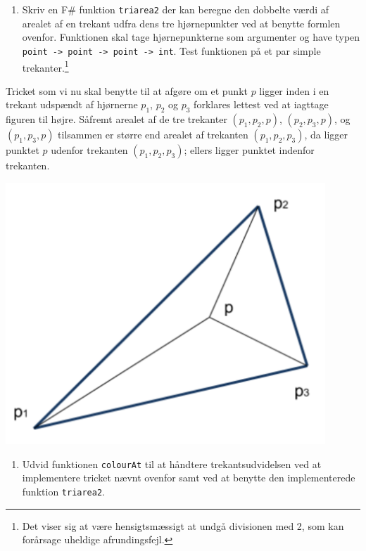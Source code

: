 \documentclass[a4paper,12pt]{article}
\begin{document}
\begin{enumerate}[label=8g.\arabic*,start=2]

\item Skriv en F\# funktion \lstinline{triarea2} der kan beregne den
  dobbelte værdi af arealet af en trekant udfra dens tre hjørnepunkter
  ved at benytte formlen ovenfor. Funktionen skal tage hjørnepunkterne
  som argumenter og have typen \lstinline{point -> point -> point -> int}. Test funktionen på et par simple trekanter.\footnote{Det
    viser sig at være hensigtsmæssigt at undgå divisionen med 2, som
    kan forårsage uheldige afrundingsfejl.}

\end{enumerate}

\begin{minipage}{.62\textwidth}

  Tricket som vi nu skal benytte til at afgøre om et punkt $p$ ligger
  inden i en trekant udspændt af hjørnerne $p_1$, $p_2$ og $p_3$
  forklares lettest ved at iagttage figuren til højre. Såfremt arealet
  af de tre trekanter $(p_1, p_2, p)$, $(p_2,p_3,p)$, og $(p_1,p_3,p)$
  tilsammen er større end arealet af trekanten $(p_1,p_2,p_3)$, da
  ligger punktet $p$ udenfor trekanten $(p_1,p_2,p_3)$; ellers ligger
  punktet indenfor trekanten.

\end{minipage} \hfill \begin{minipage}{.35\textwidth}
\includegraphics[width=0.9\textwidth]{triarea.png}
\end{minipage}

\begin{enumerate}[label=8g.\arabic*,start=3]

\item Udvid funktionen \texttt{colourAt} til at håndtere
  trekantsudvidelsen ved at implementere tricket nævnt ovenfor samt
  ved at benytte den implementerede funktion \lstinline{triarea2}.

\end{enumerate}
\end{document}
